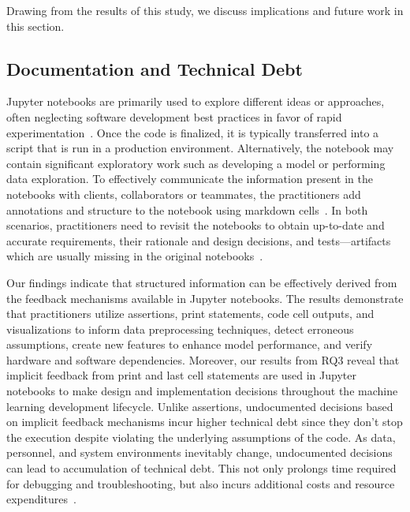 \documentclass[journal]{IEEEtran}       %
\begin{document}
Drawing from the results of this study, we discuss implications and
future work in this section.

\subsection{Documentation and Technical Debt}

Jupyter notebooks are primarily used to explore different ideas or
approaches, often neglecting software development best practices in
favor of rapid
experimentation~\cite{kery2018story,rule2018exploration,pimentel2019large-scale}.
Once the code is finalized, it is typically transferred into a script
that is run in a production environment. Alternatively, the notebook
may contain significant exploratory work such as developing a model
or performing data exploration. To effectively communicate the
information present in the notebooks with clients, collaborators or
teammates, the practitioners add annotations and structure to the
notebook using markdown
cells~\cite{kery2018story,rule2018exploration}. In both scenarios,
practitioners need to revisit the notebooks to obtain up-to-date and
accurate requirements, their rationale and design decisions, and
tests---artifacts which are usually missing in the original
notebooks~\cite{pimentel2019large-scale,psallidas2019data,grotov2022large-scale}.

Our findings indicate that structured information can be effectively
derived from the feedback mechanisms available in Jupyter notebooks.
The results demonstrate that practitioners utilize assertions, print
statements, code cell outputs, and visualizations to inform data
preprocessing techniques, detect erroneous assumptions, create new
features to enhance model performance, and verify hardware and
software dependencies. Moreover, our results from RQ3 reveal that
implicit feedback from print and last cell statements are used in
Jupyter notebooks to make design and implementation decisions
throughout the machine learning development lifecycle. Unlike
assertions, undocumented decisions based on implicit feedback
mechanisms incur higher technical debt since they don't stop the
execution despite violating the underlying assumptions of the code.
As data, personnel, and system environments inevitably change,
undocumented decisions can lead to accumulation of technical debt.
This not only prolongs time required for debugging and
troubleshooting, but also incurs additional costs and resource
expenditures~\cite{sculley2015hidden,amershi2019software,sambasivan2021everyone}.
\end{document}
